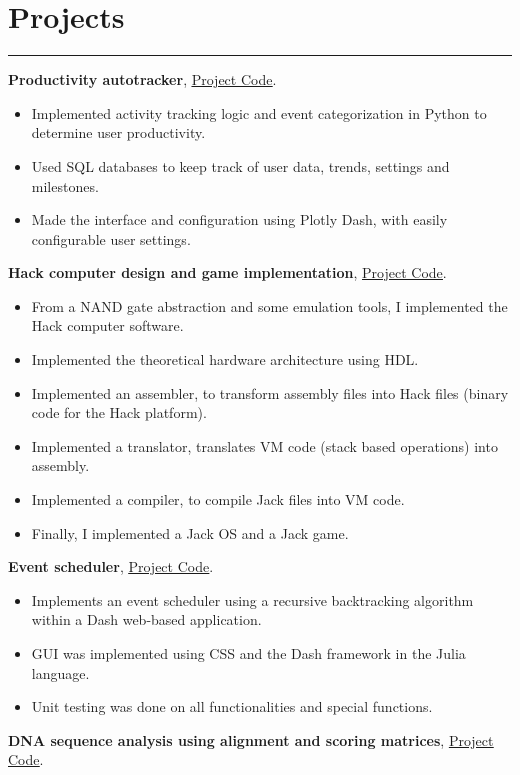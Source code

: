 \documentclass[a4paper,10pt]{article}
\newcommand{\ulink}[2]{\href{#1}{\underline{#2}}}
\begin{document}
\section*{Projects}
\hrule
\vspace{2mm}
\textbf{Productivity autotracker}, \ulink{https://github.com/rokobo/Productivity-autotracker}{Project Code}.
\begin{itemize}[itemsep=0pt]
  \item Implemented activity tracking logic and event categorization in Python to determine user productivity.
  \item Used SQL databases to keep track of user data, trends, settings and milestones.
  \item Made the interface and configuration using Plotly Dash, with easily configurable user settings.
\end{itemize}
\textbf{Hack computer design and game implementation}, \ulink{https://github.com/rokobo/From-Nand-gates-to-Tetris-implementation}{Project Code}.
\begin{itemize}[itemsep=0pt]
  \item From a NAND gate abstraction and some emulation tools, I implemented the Hack computer software.
  \item Implemented the theoretical hardware architecture using HDL.
  \item Implemented an assembler, to transform assembly files into Hack files (binary code for the Hack platform).
  \item Implemented a translator, translates VM code (stack based operations) into assembly.
  \item Implemented a compiler, to compile Jack files into VM code.
  \item Finally, I implemented a Jack OS and a Jack game.
\end{itemize}
\textbf{Event scheduler}, \ulink{https://github.com/rokobo/Event-Scheduler}{Project Code}.
\begin{itemize}[itemsep=0pt]
  \item Implements an event scheduler using a recursive backtracking algorithm within a Dash web-based application.
  \item GUI was implemented using CSS and the Dash framework in the Julia language.
  \item Unit testing was done on all functionalities and special functions.
\end{itemize}
\textbf{DNA sequence analysis using alignment and scoring matrices}, \ulink{https://github.com/rokobo/DNA-Sequence-Analysis}{Project Code}.
\end{document}

